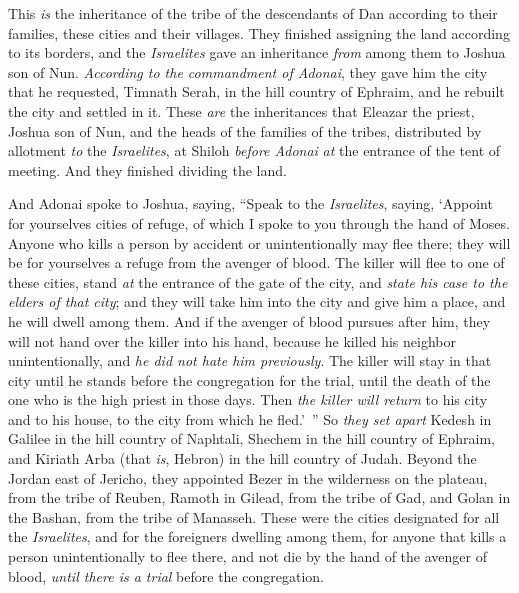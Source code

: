 \begin{biblechapter}
\verse This \textit{is} the inheritance of the tribe of the descendants of Dan according to their families, these cities and their villages.
 They finished assigning the land according to its borders, and the \textit{Israelites} gave an inheritance \textit{from} among them to Joshua son of Nun.
\verse \textit{According to the commandment of Adonai}, they gave him the city that he requested, Timnath Serah, in the hill country of Ephraim, and he rebuilt the city and settled in it.
\verse These \textit{are} the inheritances that Eleazar the priest, Joshua son of Nun, and the heads of the families of the tribes, distributed by allotment \textit{to} the \textit{Israelites}, at Shiloh \textit{before Adonai} \textit{at} the entrance of the tent of meeting. And they finished dividing the land.
\end{biblechapter}

\begin{biblechapter} %
 And Adonai spoke to Joshua, saying,
\verse “Speak to the \textit{Israelites}, saying, ‘Appoint for yourselves cities of refuge, of which I spoke to you through the hand of Moses.
\verse Anyone who kills a person by accident or unintentionally may flee there; they will be for yourselves a refuge from the avenger of blood.
\verse The killer will flee to one of these cities, stand \textit{at} the entrance of the gate of the city, and \textit{state his case to the elders of that city}; and they will take him into the city and give him a place, and he will dwell among them.
\verse And if the avenger of blood pursues after him, they will not hand over the killer into his hand, because he killed his neighbor unintentionally, and \textit{he did not hate him previously}.
\verse The killer will stay in that city until he stands before the congregation for the trial, until the death of the one who is the high priest in those days. Then \textit{the killer will return} to his city and to his house, to the city from which he fled.’ ”
\verse So \textit{they set apart} Kedesh in Galilee in the hill country of Naphtali, Shechem in the hill country of Ephraim, and Kiriath Arba (that \textit{is}, Hebron) in the hill country of Judah.
\verse Beyond the Jordan east of Jericho, they appointed Bezer in the wilderness on the plateau, from the tribe of Reuben, Ramoth in Gilead, from the tribe of Gad, and Golan in the Bashan, from the tribe of Manasseh.
\verse These were the cities designated for all the \textit{Israelites}, and for the foreigners dwelling among them, for anyone that kills a person unintentionally to flee there, and not die by the hand of the avenger of blood, \textit{until there is a trial} before the congregation.
\end{biblechapter}

